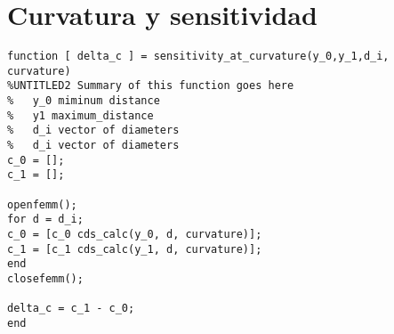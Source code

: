 \section{Curvatura y sensitividad}

\begin{lstlisting}[frame=single]
function [ delta_c ] = sensitivity_at_curvature(y_0,y_1,d_i, curvature)
%UNTITLED2 Summary of this function goes here
%   y_0 miminum distance
%   y1 maximum_distance
%   d_i vector of diameters
%   d_i vector of diameters
c_0 = [];
c_1 = [];

openfemm();
for d = d_i;
c_0 = [c_0 cds_calc(y_0, d, curvature)];
c_1 = [c_1 cds_calc(y_1, d, curvature)];
end
closefemm();

delta_c = c_1 - c_0;
end

\end{lstlisting}
